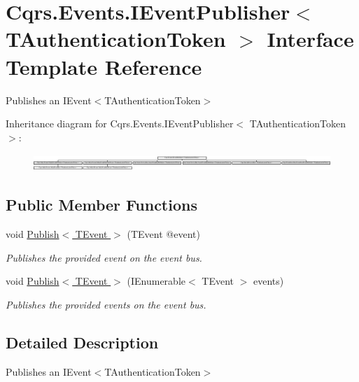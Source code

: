 \hypertarget{interfaceCqrs_1_1Events_1_1IEventPublisher}{}\section{Cqrs.\+Events.\+I\+Event\+Publisher$<$ T\+Authentication\+Token $>$ Interface Template Reference}
\label{interfaceCqrs_1_1Events_1_1IEventPublisher}


Publishes an I\+Event$<$\+T\+Authentication\+Token$>$  


Inheritance diagram for Cqrs.\+Events.\+I\+Event\+Publisher$<$ T\+Authentication\+Token $>$\+:\begin{figure}[H]
\begin{center}
\leavevmode
\includegraphics[height=0.633484cm]{interfaceCqrs_1_1Events_1_1IEventPublisher}
\end{center}
\end{figure}
\subsection*{Public Member Functions}
\begin{DoxyCompactItemize}
\item 
void \hyperlink{interfaceCqrs_1_1Events_1_1IEventPublisher_a02f0db0bc9b3aa1c7f766f58f8422ee3_a02f0db0bc9b3aa1c7f766f58f8422ee3}{Publish$<$ T\+Event $>$} (T\+Event @event)
\begin{DoxyCompactList}\small\item\em Publishes the provided {\itshape event}  on the event bus. \end{DoxyCompactList}\item 
void \hyperlink{interfaceCqrs_1_1Events_1_1IEventPublisher_a2cbcc3d2c24d015abef6337714ec51ff_a2cbcc3d2c24d015abef6337714ec51ff}{Publish$<$ T\+Event $>$} (I\+Enumerable$<$ T\+Event $>$ events)
\begin{DoxyCompactList}\small\item\em Publishes the provided {\itshape events}  on the event bus. \end{DoxyCompactList}\end{DoxyCompactItemize}


\subsection{Detailed Description}
Publishes an I\+Event$<$\+T\+Authentication\+Token$>$ 




